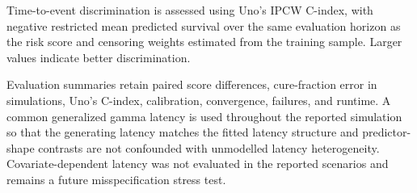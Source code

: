 Time-to-event discrimination is assessed using Uno's IPCW C-index,\cite{uno2011}
with negative restricted mean predicted survival over the same evaluation
horizon as the risk score and censoring weights estimated from the training
sample. Larger values indicate better discrimination.

Evaluation summaries retain paired score differences, cure-fraction
error in simulations, Uno's C-index, calibration,
convergence, failures, and runtime. A common generalized gamma latency
is used throughout the reported simulation so that the generating
latency matches the fitted latency structure and predictor-shape
contrasts are not confounded with unmodelled latency heterogeneity.
Covariate-dependent latency was not evaluated in the reported scenarios
and remains a future misspecification stress test.





